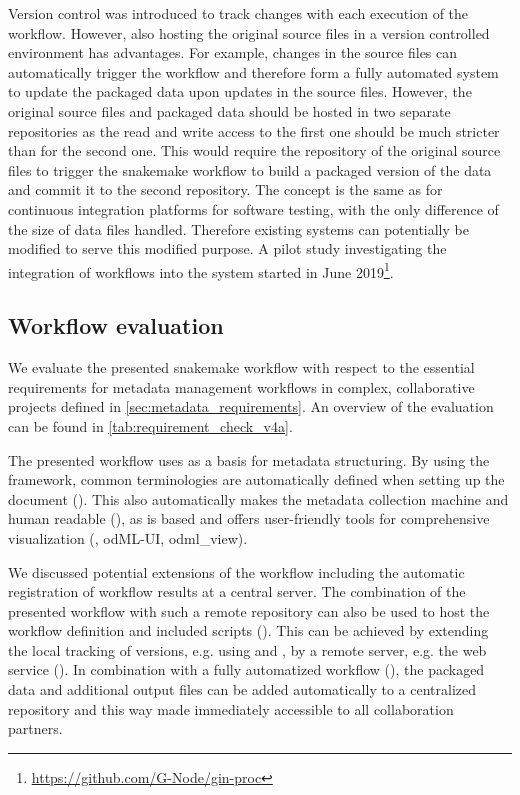 Version control was introduced to track changes with each execution of the workflow. However, also hosting the original source files in a version controlled environment has advantages. For example, changes in the source files can automatically trigger the workflow and therefore form a fully automated system to update the packaged data upon updates in the source files. However, the original source files and packaged data should be hosted in two separate repositories as the read and write access to the first one should be much stricter than for the second one. This would require the repository of the original source files to trigger the snakemake workflow to build a packaged version of the data and commit it to the second repository. The concept is the same as for continuous integration platforms for software testing, with the only difference of the size of data files handled. Therefore existing systems can potentially be modified to serve this modified purpose. A pilot study investigating the integration of  workflows into the  system started in June 2019\footnote{\url{https://github.com/G-Node/gin-proc}}.


\subsection{Workflow evaluation}
We evaluate the presented snakemake workflow with respect to the essential requirements for metadata management workflows in complex, collaborative projects defined in \cref{sec:metadata_requirements}. An overview of the evaluation can be found in \cref{tab:requirement_check_v4a}.

The presented workflow uses  as a basis for metadata structuring. By using the  framework, common terminologies are automatically defined when setting up the  document (). This also automatically makes the metadata collection machine and human readable (), as  is  based and offers user-friendly tools for comprehensive visualization (, odML-UI, odml\_view).

We discussed potential extensions of the workflow including the automatic registration of workflow results at a central server. The combination of the presented workflow with such a remote repository can also be used to host the workflow definition and included scripts (). This can be achieved by extending the local tracking of versions, e.g. using  and , by a remote server, e.g. the  web service (). In combination with a fully automatized workflow (), the packaged data and additional output files can be added automatically to a centralized repository and this way made immediately accessible to all collaboration partners.

